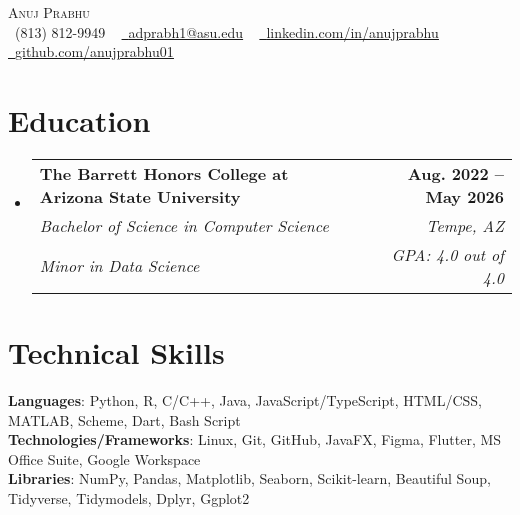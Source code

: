 \documentclass[letterpaper,11pt]{article}
\makeatletter
\newcommand{\resumeSubHeadingListStart}{\begin{itemize}[leftmargin=0.0in, label={}]}
\newcommand{\resumeSubHeadingListEnd}{\end{itemize}}
\newcommand{\resumeSubheadingEdu}[6]{
  \vspace{-2pt}\item
    \begin{tabular*}{1.0\textwidth}[t]{l@{\extracolsep{\fill}}r}
      \textbf{#1} & \textbf{\small #2} \\
      \textit{\small#3} & \textit{\small #4} \\
      \textit{\small#5} & \textit{\small #6} \\
    \end{tabular*}\vspace{-7pt}
}
\makeatother
\begin{document}

\begin{center}
    {\Huge \scshape Anuj Prabhu} \\ \vspace{1pt}
    \small \raisebox{-0.1\height}\faPhone\ (813) 812-9949 ~ \href{mailto:adprabh1@asu.edu}{\raisebox{-0.2\height}\faEnvelope\  \underline{adprabh1@asu.edu}} ~ 
    \href{https://www.linkedin.com/in/anujprabhu/}{\raisebox{-0.2\height}\faLinkedin\ \underline{linkedin.com/in/anujprabhu}}  ~
    \href{https://github.com/anujprabhu01}{\raisebox{-0.2\height}\faGithub\ \underline{github.com/anujprabhu01}} ~ {\raisebox{-0.2\height}\faFlag\ \raisebox{-0.2\height}{U.S. Citizen}}
    \vspace{-8pt}
\end{center}


\section{Education}
  \resumeSubHeadingListStart
    \resumeSubheadingEdu
    {The Barrett Honors College at Arizona State University}{Aug. 2022 -- May 2026}
      {Bachelor of Science in Computer Science}{Tempe, AZ}
      {Minor in Data Science}{GPA: 4.0 out of 4.0}
  \resumeSubHeadingListEnd

\section{Technical Skills}
 \begin{itemize}[leftmargin=0.15in, label={}]
    \small{\item{
     \textbf{Languages}{: Python, R, C/C++, Java, JavaScript/TypeScript, HTML/CSS, MATLAB, Scheme, Dart, Bash Script} \\
     \textbf{Technologies/Frameworks}{: Linux, Git, GitHub, JavaFX, Figma, Flutter, MS Office Suite, Google Workspace} \\
     \textbf{Libraries}{: NumPy, Pandas, Matplotlib, Seaborn, Scikit-learn, Beautiful Soup, Tidyverse, Tidymodels, Dplyr, Ggplot2} \\
    }}
 \end{itemize}
 \vspace{-16pt}
\end{document}
